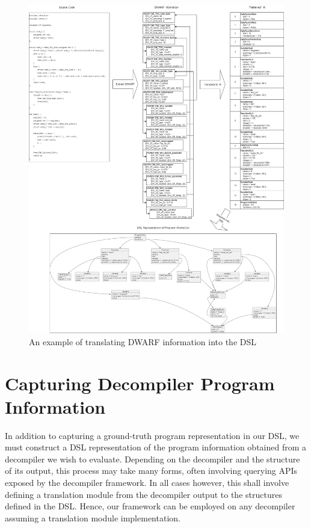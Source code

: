 \begin{figure}
    \centering
    \includegraphics[width=\textwidth]{./figures/parse-dwarf.drawio.png}
    \caption{An example of translating DWARF information into the DSL}
    \label{fig:parse-dwarf}
\end{figure}

\section{Capturing Decompiler Program Information}

In addition to capturing a ground-truth program representation in our DSL, we must construct a DSL representation of the program information obtained from a decompiler we wish to evaluate. Depending on the decompiler and the structure of its output, this process may take many forms, often involving querying APIs exposed by the decompiler framework. In all cases however, this shall involve defining a translation module from the decompiler output to the structures defined in the DSL. Hence, our framework can be employed on any decompiler assuming a translation module implementation.

